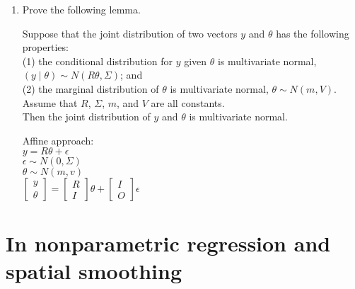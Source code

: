 \documentclass{homework}
\newcommand{\1}{\mathbf{1}}
\begin{document}
\begin{enumerate}[label=(\Alph*)]
\item Prove the following lemma.

Suppose that the joint distribution of two vectors $y$ and $\theta$ has the following properties: \\ (1) the conditional distribution for $y$ given $\theta$ is multivariate normal, $(y \mid \theta) \sim N(R\theta, \Sigma)$; and \\(2) the marginal distribution of $\theta$ is multivariate normal, $\theta \sim N(m,V)$.  \\Assume that $R$, $\Sigma$, $m$, and $V$ are all constants.  \\Then the joint distribution of $y$ and $\theta$ is multivariate normal.
\\
\par Affine approach: \\
$y = R\theta + \epsilon $\\
$\epsilon \sim N(0, \Sigma)$\\
$\theta \sim N(m,v)$\\
$\begin{bmatrix} y \\ \theta \end{bmatrix} = \begin{bmatrix} R \\ I \end{bmatrix} \theta +   \begin{bmatrix} I \\ O \end{bmatrix} \epsilon $

\end{enumerate}


\section{In nonparametric regression and spatial smoothing}
\end{document}
